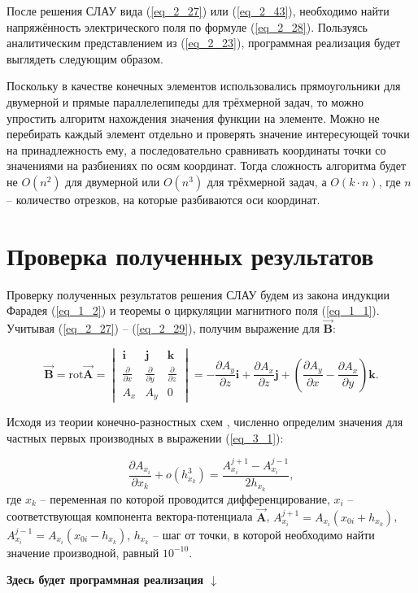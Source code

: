 После решения СЛАУ вида (\ref{eq_2_27}) или (\ref{eq_2_43}), необходимо найти напряжённость электрического поля по формуле (\ref{eq_2_28}). Пользуясь аналитическим представлением из (\ref{eq_2_23}), программная реализация будет выглядеть следующим образом.


Поскольку в качестве конечных элементов использовались прямоугольники для двумерной и прямые параллелепипеды для трёхмерной задач, то можно упростить алгоритм нахождения значения функции на элементе. Можно не перебирать каждый элемент отдельно и проверять значение интересующей точки на принадлежность ему, а последовательно сравнивать координаты точки со значениями на разбиениях по осям координат. Тогда сложность алгоритма будет не $O(n^2)$ для двумерной или $O(n^3)$ для трёхмерной задач, а $O(k \cdot n)$, где $n$ -- количество отрезков, на которые разбиваются оси координат.

 
\section{Проверка полученных результатов}

Проверку полученных результатов решения СЛАУ будем из закона индукции Фарадея (\ref{eq_1_2}) и теоремы о циркуляции магнитного поля (\ref{eq_1_1}). Учитывая (\ref{eq_2_27}) -- (\ref{eq_2_29}), получим выражение для $\overrightarrow{\textbf{B}}$:

\begin{equation} \label{eq_3_1}
	\overrightarrow{\textbf{B}} = \text{rot} \overrightarrow{\textbf{A}} = 
	\begin{vmatrix}
		\textbf{i} & \textbf{j} & \textbf{k}\\
		\frac{\partial}{\partial x} & \frac{\partial}{\partial y} & \frac{\partial}{\partial z}\\
		A_x & A_y & 0
	\end{vmatrix}
	= -\frac{\partial A_y}{\partial z} \textbf{i} + \frac{\partial A_x}{\partial z} \textbf{j} + \left(\frac{\partial A_y}{\partial x} - \frac{\partial A_x}{\partial y}\right) \textbf{k}.
\end{equation}

Исходя из теории конечно-разностных схем \cite{7}, численно определим значения для частных первых производных в выражении (\ref{eq_3_1}):

\begin{equation} \label{eq_3_2}
	\frac{\partial A_{x_i}}{\partial x_k} + o\left(h_{x_k}^3\right) = \frac{A_{x_i}^{j+1} - A_{x_i}^{j-1}}{2h_{x_k}},
\end{equation}
где $x_k$ -- переменная по которой проводится дифференцирование, $x_i$ -- соответствующая компонента вектора-потенциала $\overrightarrow{\textbf{A}}$, $A_{x_i}^{j+1} = A_{x_i}\left(x_{0i} + h_{x_k}\right)$, $A_{x_i}^{j-1} = A_{x_{i}}\left(x_{0i} - h_{x_k}\right)$, $h_{x_k}$ -- шаг от точки, в которой необходимо найти значение производной, равный $10^{-10}$.

\textbf{Здесь будет программная реализация $\downarrow$}

